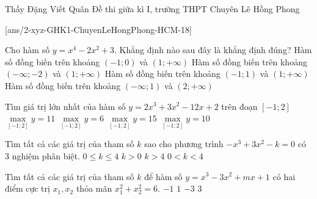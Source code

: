 
\begin{name}
{Thầy Đặng Viết Quân}
{Đề thi giữa kì I, trường THPT Chuyên Lê Hồng Phong}
\end{name}
\setcounter{ex}{0}
[ans/2-xyz-GHK1-ChuyenLeHongPhong-HCM-18]
\begin{ex}%
Cho hàm số $y=x^4-2x^2+3$. Khẳng định nào sau đây là khẳng định đúng?
\choice 
{\True Hàm số đồng biến trên khoảng $(-1;0)$ và $(1;+\infty)$}
{Hàm số đồng biến trên khoảng $(-\infty;-2)$ và $(1;+\infty)$}
{Hàm số đồng biến trên khoảng $(-1;1)$ và $(1;+\infty)$}
{Hàm số đồng biến trên khoảng $(-\infty;1)$ và $(2;+\infty)$}
\loigiai{
}
\end{ex}
\begin{ex}%
Tìm giá trị lớn nhất của hàm số $y=2x^3+3x^2-12x+2$ trên đoạn $[-1;2]$
\choice 
{$\max\limits_{[-1;2]}y=11$}
{$\max\limits_{[-1;2]}y=6$}
{\True $\max\limits_{[-1;2]}y=15$}
{$\max\limits_{[-1;2]}y=10$}
\end{ex}
\begin{ex}%
Tìm tất cả các giá trị của tham số $k$ sao cho phương trình $-x^3+3x^2-k=0$ có $3$ nghiệm phân biệt.
\choice 
{$0\leq k\leq 4$}
{$k>0$}
{$k>4$}
{\True $0<k<4$}
\end{ex}
\begin{ex}%
Tìm tất cả các giá trị của tham số $k$ để hàm số $y=x^3-3x^2+mx+1$ có hai điểm cực trị $x_1, x_2$ thỏa mãn $x_1^2+x_2^2=6$.
\choice 
{$-1$}
{$1$}
{\True $-3$}
{$3$}
\end{ex}
